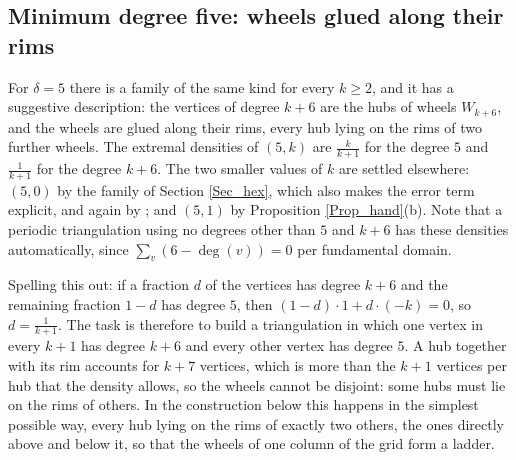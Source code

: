 \documentclass[12pt,a4paper]{article}%
\begin{document}
\subsection{Minimum degree five: wheels glued along their rims}
\label{Sec_wheel}

For $\delta =5$ there is a family of the same kind for every $k\geq 2$, and it has a suggestive
description: the vertices of degree $k+6$
are the hubs of wheels $W_{k+6}$, and the wheels are glued along their rims, every hub lying on the rims of two
further wheels. The extremal densities of $(5,k)$ are $\frac{k}{k+1}$ for the degree $5$ and $\frac{1}{k+1}$ for the
degree $k+6$. The two smaller values of $k$ are settled elsewhere: $(5,0)$ by the family of Section \ref{Sec_hex},
which also makes the error term explicit, and again by \cite[Theorem 2.5]{CaroWest}; and $(5,1)$ by
Proposition \ref{Prop_hand}(b). Note that a periodic triangulation using no degrees other than $5$ and $k+6$ has these densities
automatically, since $\sum_{v}(6-\deg (v))=0$ per fundamental domain.

Spelling this out: if a fraction $d$ of the vertices has degree $k+6$ and the remaining fraction
$1-d$ has degree $5$, then $(1-d)\cdot 1+d\cdot (-k)=0$, so $d=\frac{1}{k+1}$. The task is therefore
to build a triangulation in which one vertex in every $k+1$ has degree $k+6$ and every other vertex
has degree $5$. A hub together with its rim accounts for $k+7$ vertices, which is more than the $k+1$
vertices per hub that the density allows, so the wheels cannot be disjoint: some hubs must lie on the
rims of others. In the construction below this happens in the simplest possible way, every hub lying
on the rims of exactly two others, the ones directly above and below it, so that the wheels of one
column of the grid form a ladder.
\end{document}
